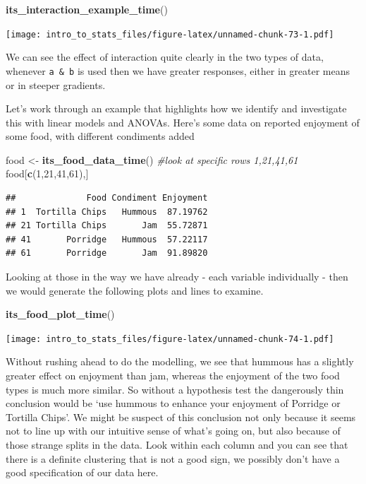 \documentclass[
]{book}
\newenvironment{Shaded}{\begin{snugshade}}{\end{snugshade}}
\newcommand{\CommentTok}[1]{\textcolor[rgb]{0.56,0.35,0.01}{\textit{#1}}}
\newcommand{\DecValTok}[1]{\textcolor[rgb]{0.00,0.00,0.81}{#1}}
\newcommand{\KeywordTok}[1]{\textcolor[rgb]{0.13,0.29,0.53}{\textbf{#1}}}
\newcommand{\NormalTok}[1]{#1}
\newcommand{\StringTok}[1]{\textcolor[rgb]{0.31,0.60,0.02}{#1}}
\begin{document}
\begin{Shaded}
\begin{Highlighting}[]
\KeywordTok{its_interaction_example_time}\NormalTok{()}
\end{Highlighting}
\end{Shaded}

\texttt{[image: intro\_to\_stats\_files/figure-latex/unnamed-chunk-73-1.pdf]}

We can see the effect of interaction quite clearly in the two types of data, whenever \texttt{a\ \&\ b} is used then we have greater responses, either in greater means or in steeper gradients.

Let's work through an example that highlights how we identify and investigate this with linear models and ANOVAs. Here's some data on reported enjoyment of some food, with different condiments added

\begin{Shaded}
\begin{Highlighting}[]
\NormalTok{food <-}\StringTok{ }\KeywordTok{its_food_data_time}\NormalTok{()}
\CommentTok{#look at specific rows 1,21,41,61}
\NormalTok{food[}\KeywordTok{c}\NormalTok{(}\DecValTok{1}\NormalTok{,}\DecValTok{21}\NormalTok{,}\DecValTok{41}\NormalTok{,}\DecValTok{61}\NormalTok{),]                                      }
\end{Highlighting}
\end{Shaded}

\begin{verbatim}
##              Food Condiment Enjoyment
## 1  Tortilla Chips   Hummous  87.19762
## 21 Tortilla Chips       Jam  55.72871
## 41       Porridge   Hummous  57.22117
## 61       Porridge       Jam  91.89820
\end{verbatim}

Looking at those in the way we have already - each variable individually - then we would generate the following plots and lines to examine.

\begin{Shaded}
\begin{Highlighting}[]
\KeywordTok{its_food_plot_time}\NormalTok{()}
\end{Highlighting}
\end{Shaded}

\texttt{[image: intro\_to\_stats\_files/figure-latex/unnamed-chunk-74-1.pdf]}

Without rushing ahead to do the modelling, we see that hummous has a slightly greater effect on enjoyment than jam, whereas the enjoyment of the two food types is much more similar. So without a hypothesis test the dangerously thin conclusion would be `use hummous to enhance your enjoyment of Porridge or Tortilla Chips'. We might be suspect of this conclusion not only because it seems not to line up with our intuitive sense of what's going on, but also because of those strange splits in the data. Look within each column and you can see that there is a definite clustering that is not a good sign, we possibly don't have a good specification of our data here.
\end{document}
